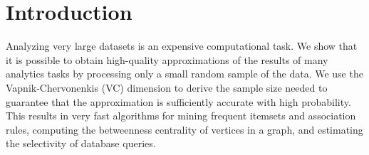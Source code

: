 \chapter{Introduction}\label{ch:intro}

 Analyzing very large datasets is an expensive
computational task. We show that it is possible to obtain high-quality
approximations of the results of many analytics tasks by processing only a small
random sample of the data. We use the Vapnik-Chervonenkis (VC) dimension to
derive the sample size needed to guarantee that the approximation is
sufficiently accurate with high probability. This results in very fast
algorithms for mining frequent itemsets and association rules, computing the
betweenness centrality of vertices in a graph, and estimating the selectivity of
database queries.

